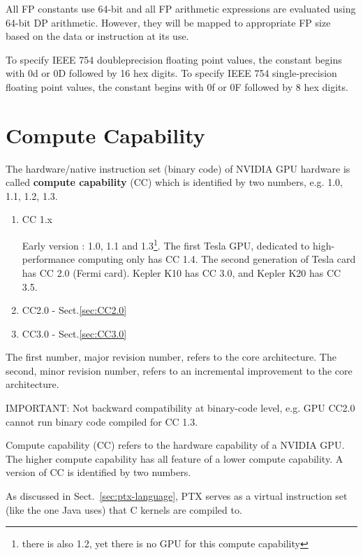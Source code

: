 All FP constants use 64-bit and all FP arithmetic expressions are
evaluated using 64-bit DP arithmetic. However, they will be mapped to
appropriate FP size based on the data or instruction at its use. 


To specify IEEE 754 doubleprecision floating point values, the
constant begins with 0d or 0D followed by 16 hex digits.  To specify
IEEE 754 single-precision floating point values, the constant begins
with 0f or 0F followed by 8 hex digits.

\section{Compute Capability}
\label{sec:compute-capability}
\label{sec:CC-X.X}

The hardware/native instruction set (binary code) of NVIDIA GPU hardware is
called {\bf compute capability} (CC) which is identified by two
numbers, e.g. 1.0, 1.1, 1.2, 1.3.
\begin{enumerate}

  \item CC 1.x

Early version :
1.0, 1.1 and 1.3\footnote{there is also 1.2, yet there is no GPU for this compute
  capability}. The first Tesla GPU, dedicated to high-performance computing only
has CC 1.4. The second generation of Tesla card has CC 2.0 (Fermi card). Kepler
K10 has CC 3.0, and Kepler K20 has CC 3.5.

  \item CC2.0 - Sect.\ref{sec:CC2.0}
  
  \item CC3.0 - Sect.\ref{sec:CC3.0}
\end{enumerate}
The first number, major revision
number, refers to the core architecture. The second, minor revision number,
refers to an incremental improvement to the core architecture. 

IMPORTANT: Not backward compatibility at binary-code level, e.g.
GPU CC2.0 cannot run binary code compiled for CC 1.3.


Compute capability (CC) refers to the hardware capability of a NVIDIA GPU.
The higher compute capability has all feature of a lower compute capability. A
version of CC is identified by two numbers.  

As discussed in Sect.~\ref{sec:ptx-language}, PTX serves as a virtual
instruction set (like the one Java uses) that C kernels are compiled
to. %

